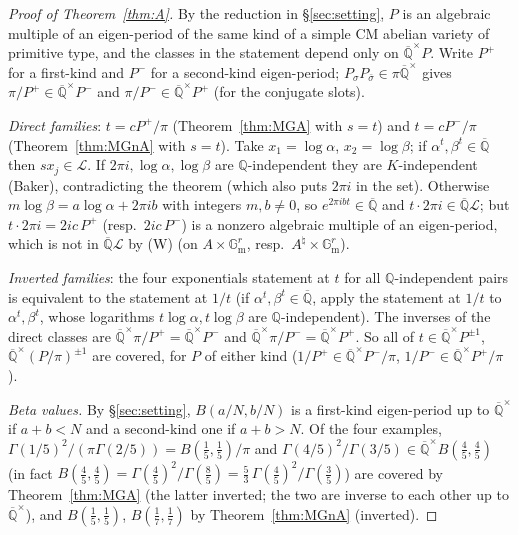 \documentclass[11pt]{amsart}
\theoremstyle{definition}
\newcommand{\Qb}{\overline{\mathbb{Q}}}
\newcommand{\Q}{\mathbb{Q}}
\newcommand{\Gm}{\mathbb{G}_{\mathrm m}}
\newcommand{\Lg}{\mathcal{L}}
\begin{document}
\begin{proof}[Proof of Theorem~\ref{thm:A}]
By the reduction in \S\ref{sec:setting}, $P$ is an algebraic multiple of an eigen-period of the same kind of a simple CM
abelian variety of primitive type, and the classes in the statement depend only on $\Qb^\times P$. Write $P^+$ for a first-kind and $P^-$ for a second-kind eigen-period; $P_\sigma P_{\bar\sigma}\in\pi\Qb^\times$ gives
$\pi/P^+\in\Qb^\times P^-$ and $\pi/P^-\in\Qb^\times P^+$ (for the conjugate slots).

\emph{Direct families}: $t=cP^+/\pi$ (Theorem~\ref{thm:MGA} with $s=t$) and $t=cP^-/\pi$ (Theorem~\ref{thm:MGnA} with $s=t$).
Take $x_1=\log\alpha$, $x_2=\log\beta$; if $\alpha^t,\beta^t\in\Qb$ then $sx_j\in\Lg$. If $2\pi i,\log\alpha,\log\beta$
are $\Q$-independent they are $K$-independent (Baker), contradicting the theorem (which also puts $2\pi i$ in the set). Otherwise
$m\log\beta=a\log\alpha+2\pi ib$ with integers $m,b\ne0$, so $e^{2\pi ibt}\in\Qb$ and $t\cdot2\pi i\in\Qb\Lg$; but
$t\cdot2\pi i=2ic\,P^+$ (resp.\ $2ic\,P^-$) is a nonzero algebraic multiple of an eigen-period, which is not in $\Qb\Lg$ by
(W) (on $A\times\Gm^r$, resp.\ $A^\natural\times\Gm^r$).

\emph{Inverted families}: the four exponentials statement at $t$ for all $\Q$-independent pairs is equivalent to the
statement at $1/t$ (if $\alpha^t,\beta^t\in\Qb$, apply the statement at $1/t$ to $\alpha^t,\beta^t$, whose logarithms
$t\log\alpha,t\log\beta$ are $\Q$-independent). The inverses of the direct classes are $\Qb^\times\pi/P^+=\Qb^\times P^-$ and
$\Qb^\times\pi/P^-=\Qb^\times P^+$. So all of $t\in\Qb^\times P^{\pm1}$, $\Qb^\times(P/\pi)^{\pm1}$ are covered, for $P$ of
either kind ($1/P^+\in\Qb^\times P^-/\pi$, $1/P^-\in\Qb^\times P^+/\pi$).

\emph{Beta values.} By \S\ref{sec:setting}, $B(a/N,b/N)$ is a first-kind eigen-period up to $\Qb^\times$ if $a+b<N$ and a
second-kind one if $a+b>N$. Of the four examples, $\Gamma(1/5)^2/(\pi\Gamma(2/5))=B(\tfrac15,\tfrac15)/\pi$ and
$\Gamma(4/5)^2/\Gamma(3/5)\in\Qb^\times B(\tfrac45,\tfrac45)$ (in fact $B(\tfrac45,\tfrac45)=\Gamma(\tfrac45)^2/\Gamma(\tfrac85)
=\tfrac53\,\Gamma(\tfrac45)^2/\Gamma(\tfrac35)$) are covered by Theorem~\ref{thm:MGA} (the latter inverted; the two
are inverse to each other up to $\Qb^\times$), and $B(\tfrac15,\tfrac15)$, $B(\tfrac17,\tfrac17)$ by
Theorem~\ref{thm:MGnA} (inverted).
\end{proof}
\end{document}
